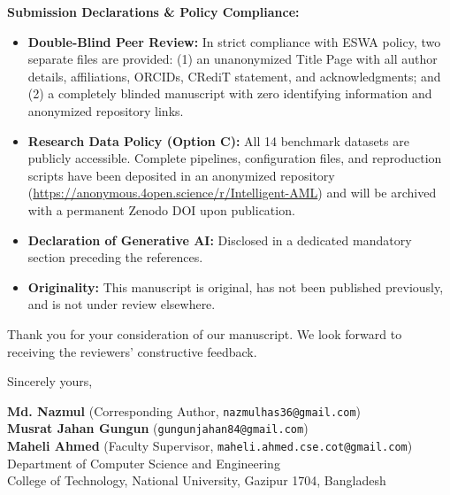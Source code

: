 \documentclass[11pt,a4paper]{article}
\begin{document}
\vspace{0.6em}
\noindent
\textbf{Submission Declarations \& Policy Compliance:}
\begin{itemize}[leftmargin=*,itemsep=2pt,topsep=2pt]
    \item \textbf{Double-Blind Peer Review:} In strict compliance with ESWA policy, two separate files are provided: (1) an unanonymized Title Page with all author details, affiliations, ORCIDs, CRediT statement, and acknowledgments; and (2) a completely blinded manuscript with zero identifying information and anonymized repository links.
    \item \textbf{Research Data Policy (Option C):} All 14 benchmark datasets are publicly accessible. Complete pipelines, configuration files, and reproduction scripts have been deposited in an anonymized repository (\url{https://anonymous.4open.science/r/Intelligent-AML}) and will be archived with a permanent Zenodo DOI upon publication.
    \item \textbf{Declaration of Generative AI:} Disclosed in a dedicated mandatory section preceding the references.
    \item \textbf{Originality:} This manuscript is original, has not been published previously, and is not under review elsewhere.
\end{itemize}

\vspace{0.8em}
\noindent
Thank you for your consideration of our manuscript. We look forward to receiving the reviewers' constructive feedback.

\vspace{1.2em}
\noindent
Sincerely yours,

\vspace{0.8em}
\noindent
\textbf{Md. Nazmul} (Corresponding Author, \texttt{nazmulhas36@gmail.com}) \\
\textbf{Musrat Jahan Gungun} (\texttt{gungunjahan84@gmail.com}) \\
\textbf{Maheli Ahmed} (Faculty Supervisor, \texttt{maheli.ahmed.cse.cot@gmail.com}) \\
Department of Computer Science and Engineering \\
College of Technology, National University, Gazipur 1704, Bangladesh
\end{document}

